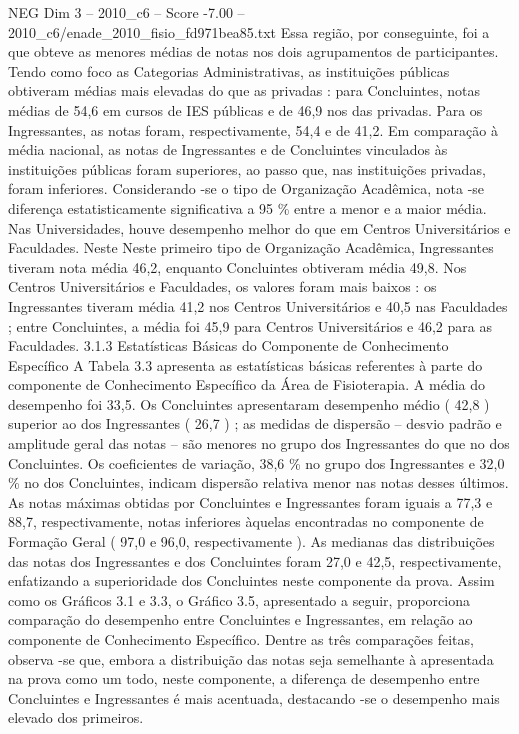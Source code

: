 \begin{textsample}{NEG Dim 3 – 2010\_c6 – Score -7.00 – 2010\_c6/enade\_2010\_fisio\_fd971bea85.txt}
Essa região, por conseguinte, foi a que obteve as menores médias de notas nos dois agrupamentos de participantes.
Tendo como foco as Categorias Administrativas, as instituições públicas obtiveram médias mais elevadas do que as privadas : para Concluintes, notas médias de 54,6 em cursos de IES públicas e de 46,9 nos das privadas.
Para os Ingressantes, as notas foram, respectivamente, 54,4 e de 41,2.
Em comparação à média nacional, as notas de Ingressantes e de Concluintes vinculados às instituições públicas foram superiores, ao passo que, nas instituições privadas, foram inferiores.
Considerando -se o tipo de Organização Acadêmica, nota -se diferença estatisticamente significativa a 95 \% entre a menor e a maior média.
Nas Universidades, houve desempenho melhor do que em Centros Universitários e Faculdades.
Neste Neste primeiro tipo de Organização Acadêmica, Ingressantes tiveram nota média 46,2, enquanto Concluintes obtiveram média 49,8.
Nos Centros Universitários e Faculdades, os valores foram mais baixos : os Ingressantes tiveram média 41,2 nos Centros Universitários e 40,5 nas Faculdades ; entre Concluintes, a média foi 45,9 para Centros Universitários e 46,2 para as Faculdades. 3.1.3 Estatísticas Básicas do Componente de Conhecimento Específico A Tabela 3.3 apresenta as estatísticas básicas referentes à parte do componente de Conhecimento Específico da Área de Fisioterapia.
A média do desempenho foi 33,5.
Os Concluintes apresentaram desempenho médio ( 42,8 ) superior ao dos Ingressantes ( 26,7 ) ; as medidas de dispersão – desvio padrão e amplitude geral das notas – são menores no grupo dos Ingressantes do que no dos Concluintes.
Os coeficientes de variação, 38,6 \% no grupo dos Ingressantes e 32,0 \% no dos Concluintes, indicam dispersão relativa menor nas notas desses últimos.
As notas máximas obtidas por Concluintes e Ingressantes foram iguais a 77,3 e 88,7, respectivamente, notas inferiores àquelas encontradas no componente de Formação Geral ( 97,0 e 96,0, respectivamente ).
As medianas das distribuições das notas dos Ingressantes e dos Concluintes foram 27,0 e 42,5, respectivamente, enfatizando a superioridade dos Concluintes neste componente da prova.
Assim como os Gráficos 3.1 e 3.3, o Gráfico 3.5, apresentado a seguir, proporciona comparação do desempenho entre Concluintes e Ingressantes, em relação ao componente de Conhecimento Específico.
Dentre as três comparações feitas, observa -se que, embora a distribuição das notas seja semelhante à apresentada na prova como um todo, neste componente, a diferença de desempenho entre Concluintes e Ingressantes é mais acentuada, destacando -se o desempenho mais elevado dos primeiros.

\end{textsample}
